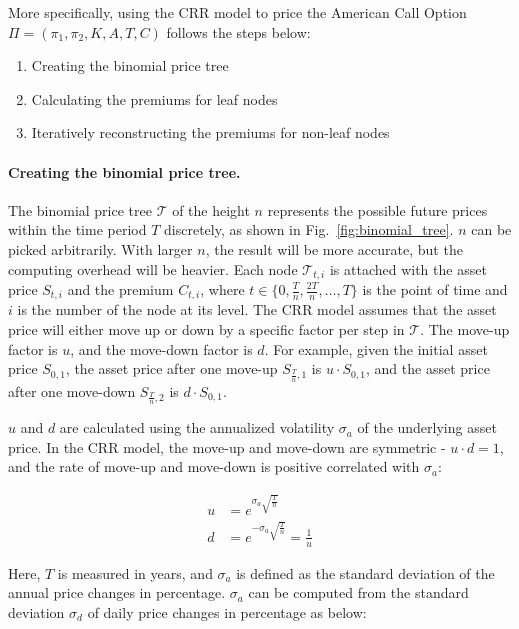 More specifically, using the CRR model to price the American Call Option $\Pi = (\pi_1, \pi_2, K, A, T, C)$ follows the steps below:

\begin{enumerate}
    \item Creating the binomial price tree
    \item Calculating the premiums for leaf nodes
    \item Iteratively reconstructing the premiums for non-leaf nodes 
\end{enumerate}

\paragraph{Creating the binomial price tree.}
The binomial price tree $\mathcal{T}$ of the height $n$ represents the possible future prices within the time period $T$ discretely, as shown in Fig.~\ref{fig:binomial_tree}.
$n$ can be picked arbitrarily. With larger $n$, the result will be more accurate, but the computing overhead will be heavier.
Each node $\mathcal{T}_{t, i}$ is attached with the asset price $S_{t, i}$ and the premium $C_{t, i}$,
where $t \in \{0, \frac{T}{n}, \frac{2T}{n}, \dots, T\}$ is the point of time and $i$ is the number of the node at its level.
The CRR model assumes that the asset price will either move up or down by a specific factor per step in $\mathcal{T}$.
The move-up factor is $u$, and the move-down factor is $d$.
For example, given the initial asset price $S_{0, 1}$, the asset price after one move-up $S_{\frac{T}{n}, 1}$ is $u \cdot S_{0, 1}$, and the asset price after one move-down $S_{\frac{T}{n}, 2}$ is $d \cdot S_{0, 1}$.

$u$ and $d$ are calculated using the annualized volatility $\sigma_a$ of the underlying asset price.
In the CRR model, the move-up and move-down are symmetric - $u \cdot d = 1$, and the rate of move-up and move-down is positive correlated with $\sigma_a$:

\begin{align} 
u &= e^{\sigma_a \sqrt{\frac{T}{n}}}\\
d &= e^{- \sigma_a \sqrt{\frac{T}{n}}} = \frac{1}{u}
\end{align}

Here, $T$ is measured in years, and $\sigma_a$ is defined as the standard deviation of the annual price changes in percentage.
$\sigma_a$ can be computed from the standard deviation $\sigma_d$ of daily price changes in percentage as below:

